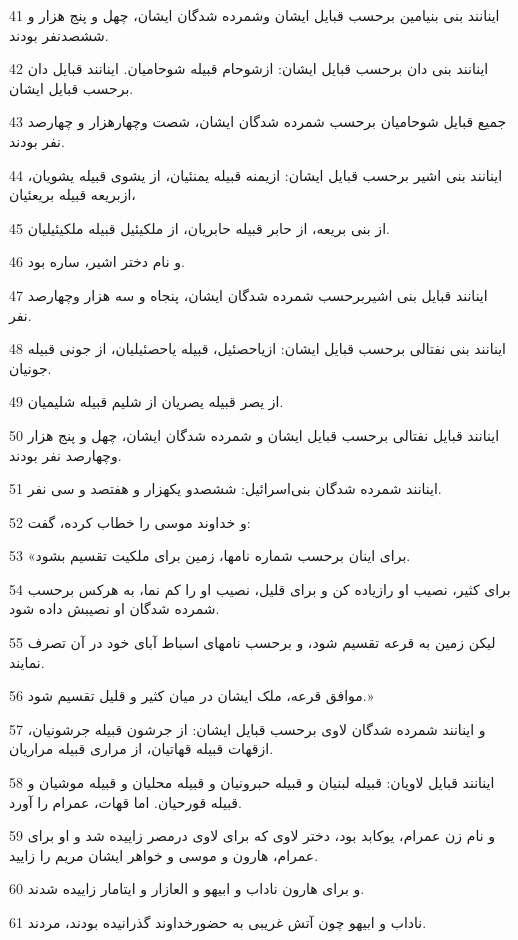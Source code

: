 \par 41 اینانند بنی بنیامین برحسب قبایل ایشان وشمرده شدگان ایشان، چهل و پنج هزار و ششصدنفر بودند.
\par 42 اینانند بنی دان برحسب قبایل ایشان: ازشوحام قبیله شوحامیان. اینانند قبایل دان برحسب قبایل ایشان.
\par 43 جمیع قبایل شوحامیان برحسب شمرده شدگان ایشان، شصت وچهارهزار و چهارصد نفر بودند.
\par 44 اینانند بنی اشیر برحسب قبایل ایشان: ازیمنه قبیله یمنئیان، از یشوی قبیله یشویان، ازبریعه قبیله بریعئیان،
\par 45 از بنی بریعه، از حابر قبیله حابریان، از ملکیئیل قبیله ملکیئیلیان.
\par 46 و نام دختر اشیر، ساره بود.
\par 47 اینانند قبایل بنی اشیربرحسب شمرده شدگان ایشان، پنجاه و سه هزار وچهارصد نفر.
\par 48 اینانند بنی نفتالی برحسب قبایل ایشان: ازیاحصئیل، قبیله یاحصئیلیان، از جونی قبیله جونیان.
\par 49 از یصر قبیله یصریان از شلیم قبیله شلیمیان.
\par 50 اینانند قبایل نفتالی برحسب قبایل ایشان و شمرده شدگان ایشان، چهل و پنج هزار وچهارصد نفر بودند.
\par 51 اینانند شمرده شدگان بنی‌اسرائیل: ششصدو یکهزار و هفتصد و سی نفر.
\par 52 و خداوند موسی را خطاب کرده، گفت:
\par 53 «برای اینان برحسب شماره نامها، زمین برای ملکیت تقسیم بشود.
\par 54 برای کثیر، نصیب او رازیاده کن و برای قلیل، نصیب او را کم نما، به هرکس برحسب شمرده شدگان او نصیبش داده شود.
\par 55 لیکن زمین به قرعه تقسیم شود، و برحسب نامهای اسباط آبای خود در آن تصرف نمایند.
\par 56 موافق قرعه، ملک ایشان در میان کثیر و قلیل تقسیم شود.»
\par 57 و اینانند شمرده شدگان لاوی برحسب قبایل ایشان: از جرشون قبیله جرشونیان، ازقهات قبیله قهاتیان، از مراری قبیله مراریان.
\par 58 اینانند قبایل لاویان: قبیله لبنیان و قبیله حبرونیان و قبیله محلیان و قبیله موشیان و قبیله قورحیان. اما قهات، عمرام را آورد.
\par 59 و نام زن عمرام، یوکابد بود، دختر لاوی که برای لاوی درمصر زاییده شد و او برای عمرام، هارون و موسی و خواهر ایشان مریم را زایید.
\par 60 و برای هارون ناداب و ابیهو و العازار و ایتامار زاییده شدند.
\par 61 ناداب و ابیهو چون آتش غریبی به حضورخداوند گذرانیده بودند، مردند.
